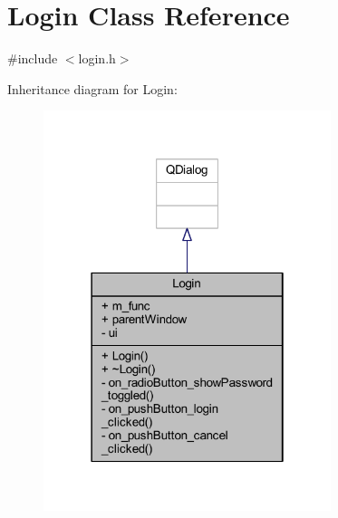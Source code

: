 \hypertarget{class_login}{}\section{Login Class Reference}
\label{class_login}


{\ttfamily \#include $<$login.\+h$>$}



Inheritance diagram for Login\+:
\nopagebreak
\begin{figure}[H]
\begin{center}
\leavevmode
\includegraphics[width=238pt]{class_login__inherit__graph}
\end{center}
\end{figure}


